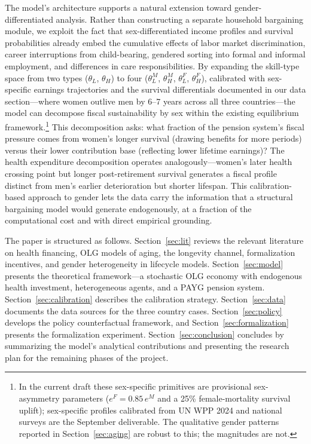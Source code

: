 \documentclass[12pt,a4paper]{article}
\begin{document}
The model's architecture supports a natural extension toward gender-differentiated analysis. Rather than constructing a separate household bargaining module, we exploit the fact that sex-differentiated income profiles and survival probabilities already embed the cumulative effects of labor market discrimination, career interruptions from child-bearing, gendered sorting into formal and informal employment, and differences in care responsibilities. By expanding the skill-type space from two types ($\theta_L$, $\theta_H$) to four ($\theta_L^M$, $\theta_H^M$, $\theta_L^F$, $\theta_H^F$), calibrated with sex-specific earnings trajectories and the survival differentials documented in our data section---where women outlive men by 6--7 years across all three countries---the model can decompose fiscal sustainability by sex within the existing equilibrium framework.\footnote{In the current draft these sex-specific primitives are provisional sex-asymmetry parameters ($e^F = 0.85\,e^M$ and a 25\% female-mortality survival uplift); sex-specific profiles calibrated from UN WPP 2024 and national surveys are the September deliverable. The qualitative gender patterns reported in Section~\ref{sec:aging} are robust to this; the magnitudes are not.} This decomposition asks: what fraction of the pension system's fiscal pressure comes from women's longer survival (drawing benefits for more periods) versus their lower contribution base (reflecting lower lifetime earnings)? The health expenditure decomposition operates analogously---women's later health crossing point but longer post-retirement survival generates a fiscal profile distinct from men's earlier deterioration but shorter lifespan. This calibration-based approach to gender lets the data carry the information that a structural bargaining model would generate endogenously, at a fraction of the computational cost and with direct empirical grounding.

The paper is structured as follows. Section~\ref{sec:lit} reviews the relevant literature on health financing, OLG models of aging, the longevity channel, formalization incentives, and gender heterogeneity in lifecycle models. Section~\ref{sec:model} presents the theoretical framework---a stochastic OLG economy with endogenous health investment, heterogeneous agents, and a PAYG pension system. Section~\ref{sec:calibration} describes the calibration strategy. Section~\ref{sec:data} documents the data sources for the three country cases. Section~\ref{sec:policy} develops the policy counterfactual framework, and Section~\ref{sec:formalization} presents the formalization experiment. Section~\ref{sec:conclusion} concludes by summarizing the model's analytical contributions and presenting the research plan for the remaining phases of the project.
\end{document}

